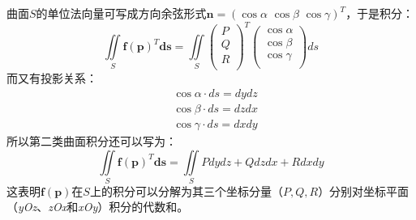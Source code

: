 曲面$S$的单位法向量可写成方向余弦形式$\mathbf{n}=\left( \cos \alpha \,\,\cos \beta \,\,\cos \gamma \right) ^T$，于是积分：
\[
\iint\limits_S{\boldsymbol{f}\left( \boldsymbol{p} \right) ^T\boldsymbol{ds}}=\iint\limits_S{\left( \begin{array}{c}
	P\\
	Q\\
	R\\
\end{array} \right) ^T\left( \begin{array}{c}
	\cos \alpha\\
	\cos \beta\\
	\cos \gamma\\
\end{array} \right) ds}
\]
而又有投影关系：
\begin{align*}
&\cos \alpha \cdot ds=dydz \\
&\cos \beta \cdot ds=dzdx \\
&\cos \gamma \cdot ds=dxdy
\end{align*}
所以第二类曲面积分还可以写为：
\[
\iint\limits_S{\boldsymbol{f}\left( \boldsymbol{p} \right) ^T\boldsymbol{ds}}=\iint\limits_S{Pdydz+Qdzdx+Rdxdy}
\]
这表明$\boldsymbol{f}\left( \boldsymbol{p} \right) $在$S$上的积分可以分解为其三个坐标分量（$P,Q,R$）分别对坐标平面（{\it yOz}、{\it zOx}和{\it xOy}）积分的代数和。




